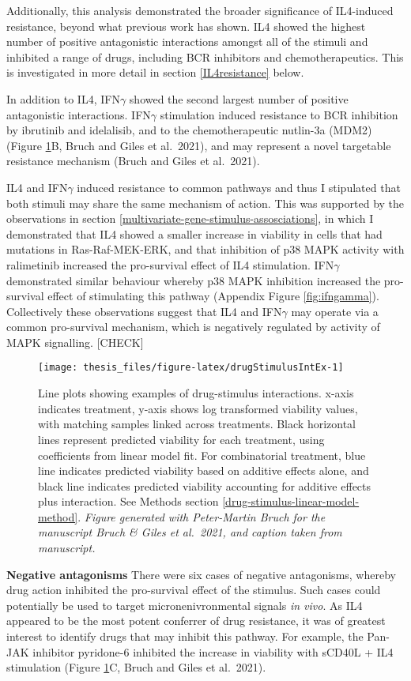 \documentclass[11pt, a4paper, twosided]{book}
\begin{document}
Additionally, this analysis demonstrated the broader significance of IL4-induced resistance, beyond what previous work has shown. IL4 showed the highest number of positive antagonistic interactions amongst all of the stimuli and inhibited a range of drugs, including BCR inhibitors and chemotherapeutics. This is investigated in more detail in section \ref{IL4resistance} below.

In addition to IL4, IFN\(\gamma\) showed the second largest number of positive antagonistic interactions. IFN\(\gamma\) stimulation induced resistance to BCR inhibition by ibrutinib and idelalisib, and to the chemotherapeutic nutlin-3a (MDM2) (Figure \ref{fig:drugStimulusIntEx}B, Bruch and Giles et al.~2021), and may represent a novel targetable resistance mechanism (Bruch and Giles et al.~2021).

IL4 and IFN\(\gamma\) induced resistance to common pathways and thus I stipulated that both stimuli may share the same mechanism of action. This was supported by the observations in section \ref{multivariate-gene-stimulus-assosciations}, in which I demonstrated that IL4 showed a smaller increase in viability in cells that had mutations in Ras-Raf-MEK-ERK, and that inhibition of p38 MAPK activity with ralimetinib increased the pro-survival effect of IL4 stimulation. IFN\(\gamma\) demonstrated similar behaviour whereby p38 MAPK inhibition increased the pro-survival effect of stimulating this pathway (Appendix Figure \ref{fig:ifngamma}). Collectively these observations suggest that IL4 and IFN\(\gamma\) may operate via a common pro-survival mechanism, which is negatively regulated by activity of MAPK signalling. {[}CHECK{]}


\begin{figure}

{\centering \texttt{[image: thesis\_files/figure-latex/drugStimulusIntEx-1]} 

}

\caption{Line plots showing examples of drug-stimulus interactions. x-axis indicates treatment, y-axis shows log transformed viability values, with matching samples linked across treatments. Black horizontal lines represent predicted viability for each treatment, using coefficients from linear model fit. For combinatorial treatment, blue line indicates predicted viability based on additive effects alone, and black line indicates predicted viability accounting for additive effects plus interaction. See Methods section \ref{drug-stimulus-linear-model-method}. \emph{Figure generated with Peter-Martin Bruch for the manuscript Bruch \& Giles et al.~2021, and caption taken from manuscript.}}\label{fig:drugStimulusIntEx}
\end{figure}
\textbf{Negative antagonisms} There were six cases of negative antagonisms, whereby drug action inhibited the pro-survival effect of the stimulus. Such cases could potentially be used to target micronenivronmental signals \emph{in vivo}. As IL4 appeared to be the most potent conferrer of drug resistance, it was of greatest interest to identify drugs that may inhibit this pathway. For example, the Pan-JAK inhibitor pyridone-6 inhibited the increase in viability with sCD40L + IL4 stimulation (Figure \ref{fig:drugStimulusIntEx}C, Bruch and Giles et al.~2021).
\end{document}
